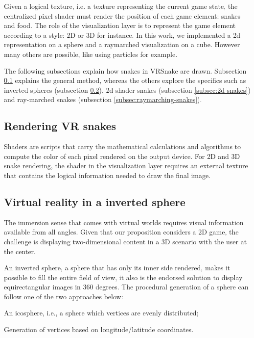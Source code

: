 \documentclass[runningheads]{llncs}
\begin{document}
Given a logical texture, i.e. a texture representing the current game state, the centralized pixel shader must render the position of each game element: snakes and food. The role of the visualization layer is to represent the game element according to a style: 2D or 3D for instance. In this work, we implemented a 2d representation on a sphere and a raymarched visualization on a cube. However many others are possible, like using particles for example.


The following subsections explain how snakes in VRSnake are drawn. Subsection \ref{subsec:rendering-snakes} explains the general method, whereas the others explore the specifics such as inverted spheres (subsection \ref{subsec:inverted-sphere}), 2d shader snakes (subsection \ref{subsec:2d-snakes}) and ray-marched snakes (subsection \ref{subsec:raymarching-snakes}).

\subsection{Rendering VR snakes}
\label{subsec:rendering-snakes}
Shaders are scripts that carry the mathematical calculations and algorithms to compute the color of each pixel rendered on the output device. For 2D and 3D snake rendering, the shader in the visualization layer requires an external texture that contains the logical information needed to draw the final image.

\subsection{Virtual reality in a inverted sphere}
\label{subsec:inverted-sphere}
The immersion sense that comes with virtual worlds requires visual information available from all angles. Given that our proposition considers a 2D game, the challenge is displaying two-dimensional content in a 3D scenario with the user at the center.

An inverted sphere, a sphere that has only its inner side rendered, makes it possible to fill the entire field of view, it also is the endorsed solution to display equirectangular images in 360 degrees. The procedural generation of a sphere can follow one of the two approaches below:

\begin{enumerate}
  \begin{item} An icosphere, i.e., a sphere which vertices are evenly distributed;
 \end{item}
  \begin{item} Generation of vertices based on longitude/latitude coordinates. \end{item}
\end{enumerate}
\end{document}
